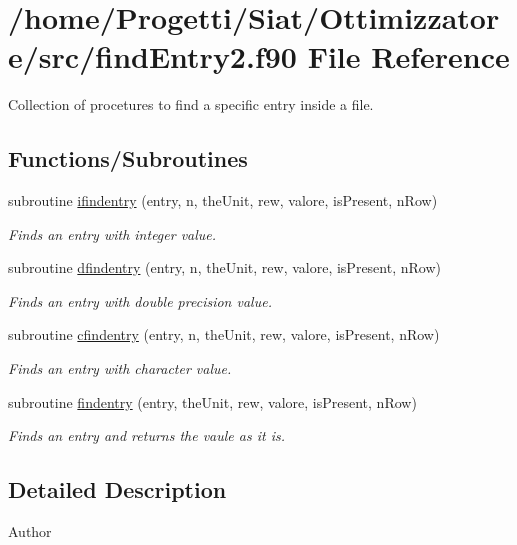 \hypertarget{find_entry2_8f90}{\section{/home/\-Progetti/\-Siat/\-Ottimizzatore/src/find\-Entry2.f90 File Reference}
\label{find_entry2_8f90}
}


Collection of procetures to find a specific entry inside a file.  


\subsection*{Functions/\-Subroutines}
\begin{DoxyCompactItemize}
\item 
subroutine \hyperlink{find_entry2_8f90_a708156401460d527e8e70817b460bf8d}{ifindentry} (entry, n, the\-Unit, rew, valore, is\-Present, n\-Row)
\begin{DoxyCompactList}\small\item\em Finds an entry with integer value. \end{DoxyCompactList}\item 
subroutine \hyperlink{find_entry2_8f90_ab66eb6763b6ded668652e5783b3a5e80}{dfindentry} (entry, n, the\-Unit, rew, valore, is\-Present, n\-Row)
\begin{DoxyCompactList}\small\item\em Finds an entry with double precision value. \end{DoxyCompactList}\item 
subroutine \hyperlink{find_entry2_8f90_a82fb26aa686ac91d56422f8405ba79fb}{cfindentry} (entry, n, the\-Unit, rew, valore, is\-Present, n\-Row)
\begin{DoxyCompactList}\small\item\em Finds an entry with character value. \end{DoxyCompactList}\item 
subroutine \hyperlink{find_entry2_8f90_a5588807ee16232625f0911c02c0a7af9}{findentry} (entry, the\-Unit, rew, valore, is\-Present, n\-Row)
\begin{DoxyCompactList}\small\item\em Finds an entry and returns the vaule as it is. \end{DoxyCompactList}\end{DoxyCompactItemize}


\subsection{Detailed Description}
\begin{DoxyAuthor}{Author}

\end{DoxyAuthor}


